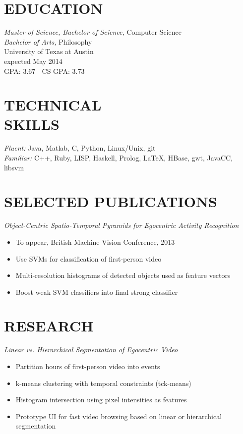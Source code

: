 \documentclass[line,margin]{res}
\begin{document}
\address{\textbf{email:} tomas.mccandless@gmail.com, \textbf{phone:} (210) 232-1477} 
\address{\textbf{web:} tomasmccandless.com}

 
\begin{resume}
 
 
\section{EDUCATION} {\sl Master of Science, Bachelor of Science,} Computer Science \\
										{\sl Bachelor of Arts,} Philosophy \\
                University of Texas at Austin\\
								expected May 2014 \\
								GPA: 3.67  $\;$ CS GPA: 3.73 
 
\section{TECHNICAL \\ SKILLS} {\sl Fluent:} Java, Matlab, C, Python, Linux/Unix, git \\
                {\sl Familiar:} C++, Ruby, LISP, Haskell, Prolog, \LaTeX, HBase, gwt, JavaCC, libsvm \\


                              \section{SELECTED PUBLICATIONS} {\sl Object-Centric Spatio-Temporal Pyramids for Egocentric Activity Recognition}
	\begin{itemize} \itemsep -2pt
  \item To appear, British Machine Vision Conference, 2013
	\item Use SVMs for classification of first-person video
	\item Multi-resolution histograms of detected objects used as feature vectors
	\item Boost weak SVM classifiers into final strong classifier 
	\end{itemize}


\section{RESEARCH} {\sl Linear vs. Hierarchical Segmentation of Egocentric Video} 
	\begin{itemize} \itemsep -2pt
	\item Partition hours of first-person video into events 
	\item k-means clustering with temporal constraints (tck-means)
	\item Histogram intersection using pixel intensities as features
	\item Prototype UI for fast video browsing based on linear or hierarchical segmentation
	\end{itemize}


\end{resume}
\end{document}
